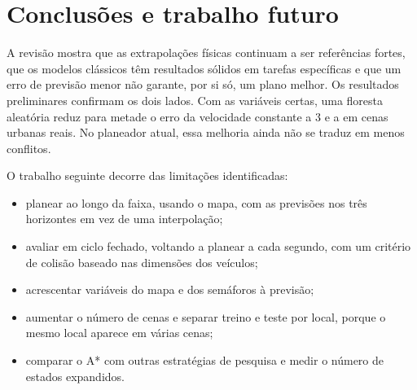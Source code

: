 \section{Conclusões e trabalho futuro}
\label{sec:conclusao}

A revisão mostra que as extrapolações físicas continuam a ser referências
fortes, que os modelos clássicos têm resultados sólidos em tarefas
específicas e que um erro de previsão menor não garante, por si só, um
plano melhor. Os resultados preliminares confirmam os dois lados. Com as
variáveis certas, uma floresta aleatória reduz para metade o erro da
velocidade constante a 3 e a  em cenas urbanas reais. No
planeador atual, essa melhoria ainda não se traduz em menos conflitos.

O trabalho seguinte decorre das limitações identificadas:
\begin{itemize}
  \item planear ao longo da faixa, usando o mapa, com as previsões nos
    três horizontes em vez de uma interpolação;
  \item avaliar em ciclo fechado, voltando a planear a cada segundo, com
    um critério de colisão baseado nas dimensões dos veículos;
  \item acrescentar variáveis do mapa e dos semáforos à previsão;
  \item aumentar o número de cenas e separar treino e teste por local,
    porque o mesmo local aparece em várias cenas;
  \item comparar o A* com outras estratégias de pesquisa e medir o número
    de estados expandidos.
\end{itemize}

